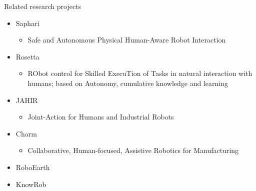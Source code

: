 \begin{frame}{Related research projects}
	\begin{itemize}
		\item Saphari
		\begin{itemize}
			\item Safe and Autonomous Physical Human-Aware Robot Interaction
		\end{itemize}
		\item Rosetta
		\begin{itemize}
			\item RObot control for Skilled ExecuTion of Tasks in natural interaction with humans; based on Autonomy, cumulative knowledge and learning
		\end{itemize}
		\item JAHIR
		\begin{itemize}
			\item Joint-Action for Humans and Industrial Robots
		\end{itemize}
		\item Charm
		\begin{itemize}
			\item Collaborative, Human-focused, Assistive Robotics for Manufacturing
		\end{itemize}
		\item RoboEarth
		\item KnowRob
	\end{itemize}
\end{frame}

